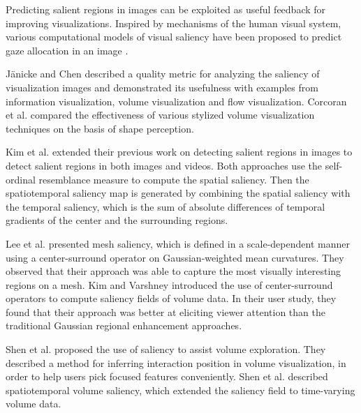 Predicting salient regions in images \cite{zhao_learning_2013} can be exploited as useful feedback for improving visualizations.
Inspired by mechanisms of the human visual system, various computational models of visual saliency have been proposed to predict gaze allocation in an image \cite{itti_model_1998} \cite{parkhurst_modeling_2002} \cite{harel_graph-based_2006} \cite{chikkerur_what_2010} \cite{mahadevan_spatiotemporal_2010} \cite{duan_visual_2011}.

J{\"a}nicke and Chen \cite{janicke_salience-based_2010} described a quality metric for analyzing the saliency of visualization images and demonstrated its usefulness with examples from information visualization, volume visualization and flow visualization.
Corcoran et al. \cite{corcoran_perceptual_2010} compared the effectiveness of various stylized volume visualization techniques on the basis of shape perception.

Kim et al. \cite{kim_spatiotemporal_2011} extended their previous work on detecting salient regions in images \cite{kim_saliency_2010} to detect salient regions in both images and videos. Both approaches use the self-ordinal resemblance measure to compute the spatial saliency. Then the spatiotemporal saliency map is generated by combining the spatial saliency with the temporal saliency, which is the sum of absolute differences of temporal gradients of the center and the surrounding regions.

Lee et al. \cite{lee_mesh_2005} presented mesh saliency, which is defined in a scale-dependent manner using a center-surround operator on Gaussian-weighted mean curvatures. They observed that their approach was able to capture the most visually interesting regions on a mesh.
Kim and Varshney \cite{kim_saliency-guided_2006} introduced the use of center-surround operators to compute saliency fields of volume data. In their user study, they found that their approach was better at eliciting viewer attention than the traditional Gaussian regional enhancement approaches.

Shen et al. \cite{shen_save:_2014} proposed the use of saliency to assist volume exploration. They described a method for inferring interaction position in volume visualization, in order to help users pick focused features conveniently.
Shen et al. \cite{shen_spatiotemporal_2015} described spatiotemporal volume saliency, which extended the saliency field \cite{kim_saliency-guided_2006} to time-varying volume data.


